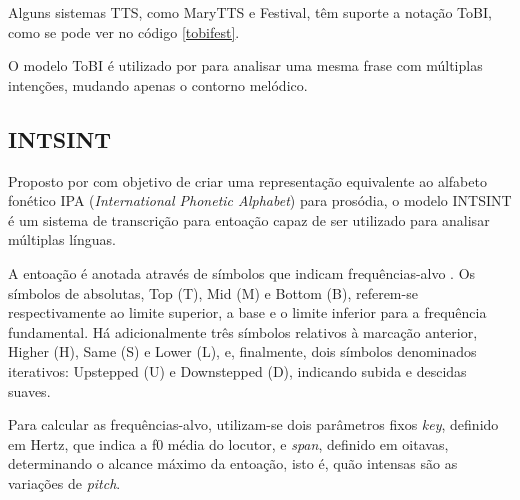 Alguns sistemas TTS, como MaryTTS e Festival, têm suporte a notação ToBI, como se
pode ver no código \ref{tobifest}.

O modelo ToBI é utilizado por  para analisar uma mesma
frase com múltiplas intenções, mudando apenas o contorno melódico.



\subsection{INTSINT}
\label{intsintsec}
Proposto por  com objetivo de criar uma representação
equivalente ao alfabeto fonético IPA (\emph{International Phonetic Alphabet})
para prosódia, o modelo INTSINT é um sistema de transcrição para entoação capaz
de ser utilizado para analisar múltiplas línguas.

A entoação é anotada através de símbolos que indicam frequências-alvo
. Os símbolos de absolutas, Top (T), Mid (M) e Bottom (B), referem-se
respectivamente ao limite superior, a base e o limite inferior para a frequência
fundamental. Há adicionalmente três símbolos relativos à marcação anterior,
Higher (H), Same (S) e Lower (L), e, finalmente, dois símbolos denominados
iterativos: Upstepped (U) e Downstepped (D), indicando subida e descidas suaves.

Para calcular as frequências-alvo, utilizam-se dois parâmetros fixos
\emph{key}, definido em Hertz, que indica a f0 média do locutor, e \emph{span},
definido em oitavas, determinando o alcance máximo da entoação, isto é, quão
intensas são as variações de \emph{pitch}.

